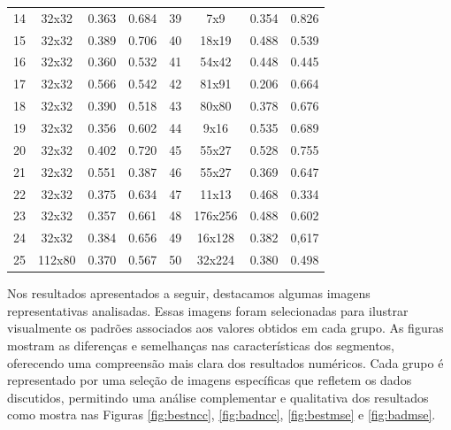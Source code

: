 \begin{table}[htbp]
\begin{tabular}{|c|c|c|c|c|c|c|c|}
    14 & 32x32  & 0.363 & 0.684 & 39 & 7x9     & 0.354 & 0.826 \\
    15 & 32x32  & 0.389 & 0.706 & 40 & 18x19   & 0.488 & 0.539 \\
    16 & 32x32  & 0.360 & 0.532 & 41 & 54x42   & 0.448 & 0.445 \\
    17 & 32x32  & 0.566 & 0.542 & 42 & 81x91   & 0.206 & 0.664 \\ 
    18 & 32x32  & 0.390 & 0.518 & 43 & 80x80   & 0.378 & 0.676 \\ 
    19 & 32x32  & 0.356 & 0.602 & 44 & 9x16    & 0.535 & 0.689 \\ 
    20 & 32x32  & 0.402 & 0.720 & 45 & 55x27   & 0.528 & 0.755 \\
    21 & 32x32  & 0.551 & 0.387 & 46 & 55x27   & 0.369 & 0.647 \\
    22 & 32x32  & 0.375 & 0.634 & 47 & 11x13   & 0.468 & 0.334 \\ 
    23 & 32x32  & 0.357 & 0.661 & 48 & 176x256 & 0.488 & 0.602 \\
    24 & 32x32  & 0.384 & 0.656 & 49 & 16x128  & 0.382 & 0,617 \\ 
    25 & 112x80 & 0.370 & 0.567 & 50 & 32x224  & 0.380 & 0.498 \\
    \hline
    \end{tabular}
    \label{tab:grupos}
\end{table}

Nos resultados apresentados a seguir, destacamos algumas imagens representativas analisadas. Essas imagens foram selecionadas para ilustrar visualmente os padrões associados aos valores obtidos em cada grupo. As figuras mostram as diferenças e semelhanças nas características dos segmentos, oferecendo uma compreensão mais clara dos resultados numéricos. Cada grupo é representado por uma seleção de imagens específicas que refletem os dados discutidos, permitindo uma análise complementar e qualitativa dos resultados como mostra nas Figuras \ref{fig:bestncc}, \ref{fig:badncc}, \ref{fig:bestmse} e \ref{fig:badmse}.


